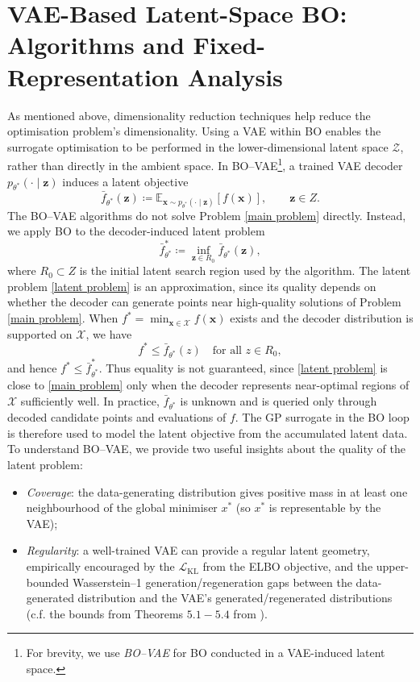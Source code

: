 \documentclass[pdflatex,sn-mathphys-num]{sn-jnl}%
\theoremstyle{thmstyleone}%
\theoremstyle{thmstyletwo}%
\theoremstyle{thmstylethree}%
\begin{document}
\section{VAE-Based Latent-Space BO: Algorithms and Fixed-Representation Analysis}\label{Alg}
As mentioned above, dimensionality reduction techniques help reduce the optimisation problem's dimensionality. Using a VAE within BO enables the surrogate optimisation to be performed in the lower-dimensional latent space $\mathcal{Z}$, rather than directly in the ambient space. In BO--VAE\footnote{For brevity, we use \textit{BO--VAE} for BO conducted in a VAE-induced latent space.}, a trained VAE decoder \(p_{\theta^\ast}(\cdot\mid \mathbf z)\) induces a latent objective
\[
    \bar f_{\theta^\ast}(\mathbf z)
    \coloneq
    \mathbb E_{\mathbf x\sim p_{\theta^\ast}(\cdot\mid \mathbf z)}
    [f(\mathbf x)],
    \qquad \mathbf z\in Z.
\]
The BO--VAE algorithms do not solve Problem \eqref{main problem} directly. Instead, we apply BO to the decoder-induced latent problem
\begin{equation}\label{latent problem}
    \bar f^\ast_{\theta^\ast}
    \coloneq
    \inf_{\mathbf z\in R_0}\bar f_{\theta^\ast}(\mathbf z),
    \tag{LP}
\end{equation}
where \(R_0\subset Z\) is the initial latent search region used by the algorithm. The latent problem \eqref{latent problem} is an approximation, since its quality depends on whether the decoder can generate points near high-quality solutions of Problem \eqref{main problem}. When \(f^\ast=\min_{\mathbf x\in \mathcal X} f(\mathbf x)\) exists and the decoder distribution is supported on \(\mathcal X\), we have
\[
    f^\ast \leq \bar f_{\theta^\ast}(z)
    \quad\text{for all } z\in R_0,
\]
and hence \(f^\ast \leq \bar f^\ast_{\theta^\ast}\). Thus equality is not guaranteed, since \eqref{latent problem} is close to \eqref{main problem} only when the decoder represents near-optimal regions of \(\mathcal X\) sufficiently well. In practice, \(\bar f_{\theta^\ast}\) is unknown and is queried only through decoded candidate points and evaluations of \(f\). The GP surrogate in the BO loop is therefore used to model the latent objective from the accumulated latent data. To understand BO--VAE, we provide two useful insights about the quality of the latent problem:

\begin{itemize}
    \item \emph{Coverage}: the data-generating distribution gives positive mass in at least one neighbourhood of the global minimiser \(x^{\ast}\) (so \(x^{\ast}\) is representable by the VAE);\\
    \item \emph{Regularity}: a well-trained VAE can provide a regular latent geometry, empirically encouraged by the $\mathcal{L}_{\mathrm{KL}}$ from the ELBO objective, and the upper-bounded Wasserstein–1 generation/regeneration gaps between the data-generated distribution and the VAE's generated/regenerated distributions (c.f. the bounds from Theorems $5.1-5.4$ from \cite{mbacke2023statisticalguaranteesvariationalautoencoders}).
\end{itemize}
\end{document}
